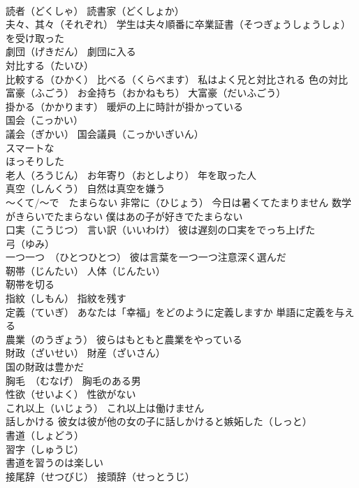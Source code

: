 \documentclass[8pt]{extreport}
\begin{document}
\begin{CJK}{UTF8}{min}
\\	読者（どくしゃ） 読書家（どくしょか）
\\	夫々、其々（それぞれ） 学生は夫々順番に卒業証書（そつぎょうしょうしょ）を受け取った
\\	劇団（げきだん） 劇団に入る
\\	対比する（たいひ）
\\	比較する（ひかく） 比べる（くらべます） 私はよく兄と対比される 色の対比
\\	富豪（ふごう） お金持ち（おかねもち） 大富豪（だいふごう）
\\	掛かる（かかります） 暖炉の上に時計が掛かっている
\\	国会（こっかい） 
\\	議会（ぎかい） 国会議員（こっかいぎいん）
\\	スマートな 
\\	ほっそりした 
\\	老人（ろうじん） お年寄り（おとしより） 年を取った人
\\	真空（しんくう） 自然は真空を嫌う
\\	～くて/～で　たまらない 非常に（ひじょう） 今日は暑くてたまりません 数学がきらいでたまらない 僕はあの子が好きでたまらない
\\	口実（こうじつ） 言い訳（いいわけ） 彼は遅刻の口実をでっち上げた
\\	弓（ゆみ） 
\\	一つ一つ　（ひとつひとつ） 彼は言葉を一つ一つ注意深く選んだ
\\	靭帯（じんたい） 人体（じんたい）
\\	靭帯を切る
\\	指紋（しもん） 指紋を残す
\\	定義（ていぎ） あなたは「幸福」をどのように定義しますか 単語に定義を与える
\\	農業（のうぎょう） 彼らはもともと農業をやっている
\\	財政（ざいせい） 財産（ざいさん）
\\	国の財政は豊かだ
\\	胸毛　（むなげ） 胸毛のある男
\\	性欲（せいよく） 性欲がない
\\	これ以上（いじょう） これ以上は働けません
\\	話しかける 彼女は彼が他の女の子に話しかけると嫉妬した（しっと）
\\	書道（しょどう）
\\	習字（しゅうじ）
\\	書道を習うのは楽しい
\\	接尾辞（せつびじ） 接頭辞（せっとうじ）

\end{CJK}
\end{document}
